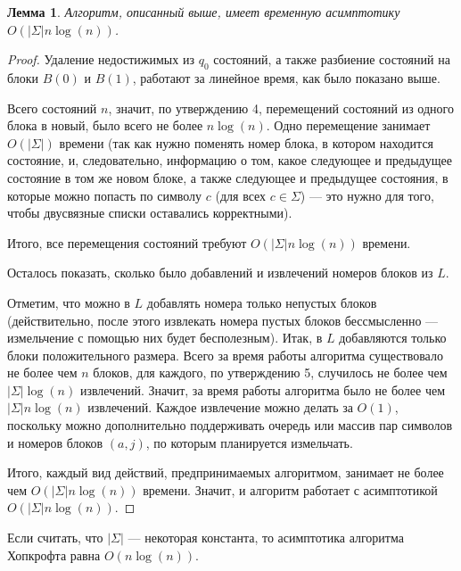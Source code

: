 \documentclass{article}
\newtheorem{lemma}{Лемма}
\begin{document}
\begin{lemma}
  \label{lemma5}
  Алгоритм, описанный выше, имеет временную асимптотику $O(|\Sigma|n\log(n))$.
\end{lemma}
\begin{proof}
  Удаление недостижимых из $q_0$ состояний, а также разбиение состояний на блоки $B(0)$ и $B(1)$, работают за линейное время, как было показано выше.

  Всего состояний $n$, значит, по утверждению 4, перемещений состояний из одного блока в новый, было всего не более $n \log(n)$. Одно перемещение занимает $O(|\Sigma|)$ времени (так как нужно поменять номер блока, в котором находится состояние, и, следовательно, информацию о том, какое следующее и предыдущее состояние в том же новом блоке, а также следующее и предыдущее состояния, в которые можно попасть по символу $c$ (для всех $c \in \Sigma$) --- это нужно для того, чтобы двусвязные списки оставались корректными).

  Итого, все перемещения состояний требуют $O(|\Sigma|n\log(n))$ времени.

  Осталось показать, сколько было добавлений и извлечений номеров блоков из $L$.

  Отметим, что можно в $L$ добавлять номера только непустых блоков (действительно, после этого извлекать номера пустых блоков бессмысленно --- измельчение с помощью них будет бесполезным). Итак, в $L$ добавляются только блоки положительного размера. Всего за время работы алгоритма существовало не более чем $n$ блоков, для каждого, по утверждению 5, случилось не более чем $|\Sigma| \log(n)$ извлечений. Значит, за время работы алгоритма было не более чем $|\Sigma| n \log(n)$ извлечений. Каждое извлечение можно делать за $O(1)$, поскольку можно дополнительно поддерживать очередь или массив пар символов и номеров блоков $(a, j)$, по которым планируется измельчать.
  

  Итого, каждый вид действий, предпринимаемых алгоритмом, занимает не более чем $O(|\Sigma|n\log(n))$ времени. Значит, и алгоритм работает с асимптотикой $O(|\Sigma|n\log(n))$.

\end{proof}
Если считать, что $|\Sigma|$ --- некоторая константа, то асимптотика алгоритма Хопкрофта равна $O(n\log(n))$.
\end{document}
